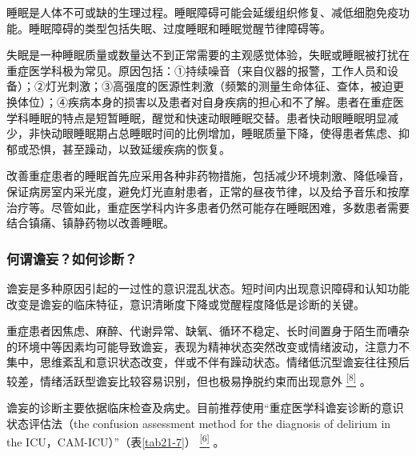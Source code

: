 睡眠是人体不可或缺的生理过程。睡眠障碍可能会延缓组织修复、减低细胞免疫功能。睡眠障碍的类型包括失眠、过度睡眠和睡眠觉醒节律障碍等。

失眠是一种睡眠质量或数量达不到正常需要的主观感觉体验，失眠或睡眠被打扰在重症医学科极为常见。原因包括：①持续噪音（来自仪器的报警，工作人员和设备）；②灯光刺激；③高强度的医源性刺激（频繁的测量生命体征、查体，被迫更换体位）；④疾病本身的损害以及患者对自身疾病的担心和不了解。患者在重症医学科睡眠的特点是短暂睡眠，醒觉和快速动眼睡眠交替。患者快动眼睡眠明显减少，非快动眼睡眠期占总睡眠时间的比例增加，睡眠质量下降，使得患者焦虑、抑郁或恐惧，甚至躁动，以致延缓疾病的恢复。

改善重症患者的睡眠首先应采用各种非药物措施，包括减少环境刺激、降低噪音，保证病房室内采光度，避免灯光直射患者，正常的昼夜节律，以及给予音乐和按摩治疗等。尽管如此，重症医学科内许多患者仍然可能存在睡眠困难，多数患者需要结合镇痛、镇静药物以改善睡眠。

\subsubsection{何谓谵妄？如何诊断？}

谵妄是多种原因引起的一过性的意识混乱状态。短时间内出现意识障碍和认知功能改变是谵妄的临床特征，意识清晰度下降或觉醒程度降低是诊断的关键。

重症患者因焦虑、麻醉、代谢异常、缺氧、循环不稳定、长时间置身于陌生而嘈杂的环境中等因素均可能导致谵妄，表现为精神状态突然改变或情绪波动，注意力不集中，思维紊乱和意识状态改变，伴或不伴有躁动状态。情绪低沉型谵妄往往预后较差，情绪活跃型谵妄比较容易识别，但也极易挣脱约束而出现意外
\protect\hyperlink{text00027.htmlux5cux23ch8-26}{\textsuperscript{{[}8{]}}}
。

谵妄的诊断主要依据临床检查及病史。目前推荐使用“重症医学科谵妄诊断的意识状态评估法（the
confusion assessment method for the diagnosis of delirium in the
ICU，CAM-ICU）”（表\ref{tab21-7}）
\protect\hyperlink{text00027.htmlux5cux23ch6-26}{\textsuperscript{{[}6{]}}}
。

